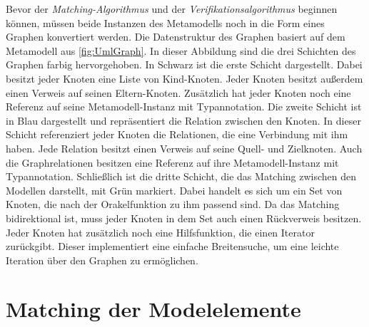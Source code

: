 Bevor der \emph{Matching-Algorithmus} und der \emph{Verifikationsalgorithmus} beginnen können, müssen beide Instanzen des Metamodells noch in die Form eines Graphen konvertiert werden.
Die Datenstruktur des Graphen basiert auf dem Metamodell aus \cref{fig:UmlGraph}.
In dieser Abbildung sind die drei Schichten des Graphen farbig hervorgehoben.
In Schwarz ist die erste Schicht dargestellt.
Dabei besitzt jeder Knoten eine Liste von Kind-Knoten.
Jeder Knoten besitzt außerdem einen Verweis auf seinen Eltern-Knoten.
Zusätzlich hat jeder Knoten noch eine Referenz auf seine Metamodell-Instanz mit Typannotation.
Die zweite Schicht ist in Blau dargestellt und repräsentiert die Relation zwischen den Knoten.
In dieser Schicht referenziert jeder Knoten die Relationen, die eine Verbindung mit ihm haben.
Jede Relation besitzt einen Verweis auf seine Quell- und Zielknoten.
Auch die Graphrelationen besitzen eine Referenz auf ihre Metamodell-Instanz mit Typannotation.
Schließlich ist die dritte Schicht, die das Matching zwischen den Modellen darstellt, mit Grün markiert.
Dabei handelt es sich um ein Set von Knoten, die nach der Orakelfunktion zu ihm passend sind.
Da das Matching bidirektional ist, muss jeder Knoten in dem Set auch einen Rückverweis besitzen.
Jeder Knoten hat zusätzlich noch eine Hilfsfunktion, die einen Iterator zurückgibt.
Dieser implementiert eine einfache Breitensuche, um eine leichte Iteration über den Graphen zu ermöglichen.

\section{Matching der Modelelemente}
\label{sec:matching_model_elements}

